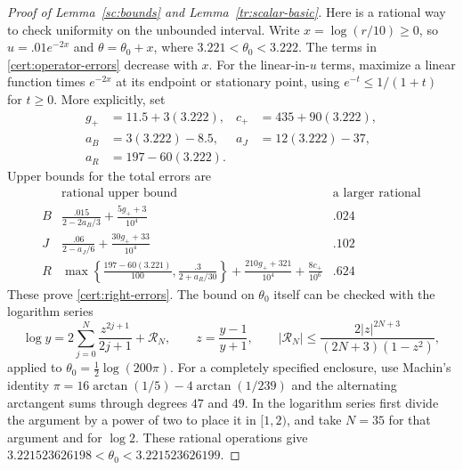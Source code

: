 \documentclass[11pt]{article}
\theoremstyle{definition}
\theoremstyle{remark}
\numberwithin{equation}{section}
\begin{document}
\begin{proof}[Proof of Lemma~\ref{sc:bounds} and Lemma~\ref{tr:scalar-basic}]
Here is a rational way to check uniformity on the unbounded interval.
Write $x=\log(r/10)\ge0$, so $u=.01e^{-2x}$ and
$\theta=\theta_0+x$, where $3.221<\theta_0<3.222$.
The terms in \eqref{cert:operator-errors} decrease with $x$. For the
linear-in-$u$ terms, maximize a linear function times $e^{-2x}$ at
its endpoint or stationary point, using $e^{-t}\le1/(1+t)$ for $t\ge0$.
More explicitly, set
\[
 \begin{aligned}
 g_+&=11.5+3(3.222),& c_+&=435+90(3.222),\\
 a_B&=3(3.222)-8.5,& a_J&=12(3.222)-37,\\
 a_R&=197-60(3.222).
 \end{aligned}
\]
Upper bounds for the total errors are
\[
 \begin{array}{c|l|c}
 &\text{rational upper bound}&\text{a larger rational}\\\hline
 B&\displaystyle\frac{.015}{2-2a_B/3}
                  +\frac{5g_++3}{10^4}&.024\\[2mm]
 J&\displaystyle\frac{.06}{2-a_J/6}
                  +\frac{30g_++33}{10^4}&.102\\[2mm]
 R&\displaystyle\max\left\{\frac{197-60(3.221)}{100},
                    \frac{.3}{2+a_R/30}\right\}
       +\frac{210g_++321}{10^4}+\frac{8c_+}{10^6}&.624
 \end{array}
\]
These prove \eqref{cert:right-errors}. The bound on $\theta_0$ itself
can be checked with the logarithm series
\[
 \log y=2\sum_{j=0}^{N}\frac{z^{2j+1}}{2j+1}+\mathcal R_N,\qquad
 z=\frac{y-1}{y+1},\qquad
 |\mathcal R_N|\le
 \frac{2|z|^{2N+3}}{(2N+3)(1-z^2)},
\]
applied to $\theta_0=\tfrac12\log(200\pi)$. For a completely
specified enclosure, use Machin's identity
$\pi=16\arctan(1/5)-4\arctan(1/239)$ and the alternating arctangent
sums through degrees $47$ and $49$. In the logarithm series first divide
the argument by a power of two to place it in $[1,2)$, and take $N=35$
for that argument and for $\log2$. These rational operations give
$3.221523626198<\theta_0<3.221523626199$.


\end{proof}
\end{document}
